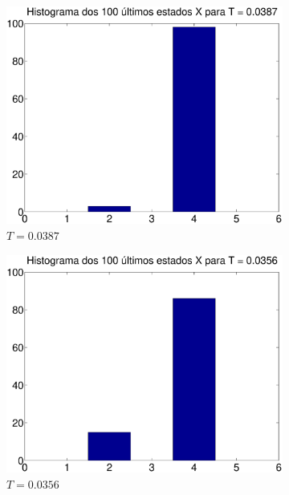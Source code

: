 \documentclass{report}
\begin{document}
\begin{figure}
\begin{subfigure}{0.32\textwidth}
		\includegraphics[width = \textwidth]{Q2_e_histograma_x_t_5}
		\caption{$T = 0.0387$}
	\end{subfigure}
		\begin{subfigure}{0.32\textwidth}
		\centering
		\includegraphics[width = \textwidth]{Q2_e_histograma_x_t_6}
		\caption{$T = 0.0356$}
	\end{subfigure}
		\begin{subfigure}{0.32\textwidth}
		\centering

\end{subfigure}
\end{figure}
\end{document}
